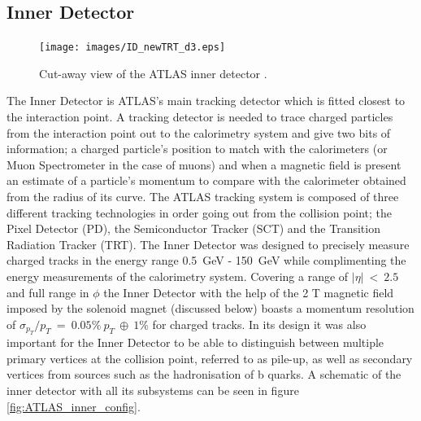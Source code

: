	\subsection{Inner Detector}

		\begin{figure}[h]
			\begin{center}
				\texttt{[image: images/ID\_newTRT\_d3.eps]}
			\end{center}
			\caption{Cut-away view of the ATLAS inner detector \cite{Aad:1129811}.}
			\label{fig:ATLAS_inner}
		\end{figure}

		The Inner Detector is ATLAS's main tracking detector which is fitted closest to the interaction point. A tracking detector is needed to trace charged particles from the interaction point out to the calorimetry system and give two bits of information; a charged particle's position to match with the calorimeters (or Muon Spectrometer in the case of muons) and when a magnetic field is present an estimate of a particle's momentum to compare with the calorimeter obtained from the radius of its curve. The  ATLAS tracking system is composed of three different tracking technologies in order going out from the collision point; the Pixel Detector (PD), the Semiconductor Tracker (SCT) and the Transition Radiation Tracker (TRT). The Inner Detector was designed to precisely measure charged tracks in the energy range 0.5~GeV - 150~GeV while complimenting the energy measurements of the calorimetry system. Covering a range of $|\eta|~<~2.5$ and full range in $\phi$ the Inner Detector with the help of the 2 T magnetic field imposed by the solenoid magnet (discussed below) boasts a momentum resolution of $\sigma_{p_{T}}/p_{T}~=~0.05\%~p_{T}~\oplus~1\%$ for charged tracks. In its design it was also important for the Inner Detector to be able to distinguish between multiple primary vertices at the collision point, referred to as pile-up, as well as secondary vertices from sources such as the hadronisation of b quarks. A schematic of the inner detector with all its subsystems can be seen in figure \ref{fig:ATLAS_inner_config}.

